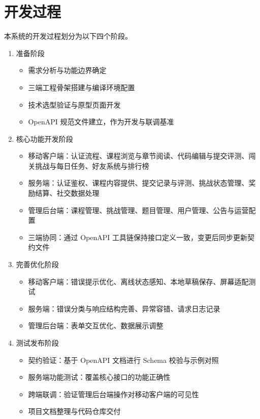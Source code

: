 \section{开发过程}

本系统的开发过程划分为以下四个阶段。

\begin{enumerate}
  \item 准备阶段
  \begin{itemize}
    \item 需求分析与功能边界确定
    \item 三端工程骨架搭建与编译环境配置
    \item 技术选型验证与原型页面开发
    \item OpenAPI 规范文件建立，作为开发与联调基准
  \end{itemize}

  \item 核心功能开发阶段
  \begin{itemize}
    \item 移动客户端：认证流程、课程浏览与章节阅读、代码编辑与提交评测、闯关挑战与每日任务、好友系统与排行榜
    \item 服务端：认证鉴权、课程内容提供、提交记录与评测、挑战状态管理、奖励结算、社交数据处理
    \item 管理后台端：课程管理、挑战管理、题目管理、用户管理、公告与运营配置
    \item 三端协同：通过 OpenAPI 工具链保持接口定义一致，变更后同步更新契约文件
  \end{itemize}

  \item 完善优化阶段
  \begin{itemize}
    \item 移动客户端：错误提示优化、离线状态感知、本地草稿保存、屏幕适配测试
    \item 服务端：错误分类与响应结构完善、异常容错、请求日志记录
    \item 管理后台端：表单交互优化、数据展示调整
  \end{itemize}

  \item 测试发布阶段
  \begin{itemize}
    \item 契约验证：基于 OpenAPI 文档进行 Schema 校验与示例对照
    \item 服务端功能测试：覆盖核心接口的功能正确性
    \item 跨端联调：验证管理后台端操作对移动客户端的可见性
    \item 项目文档整理与代码仓库交付
  \end{itemize}
\end{enumerate}


